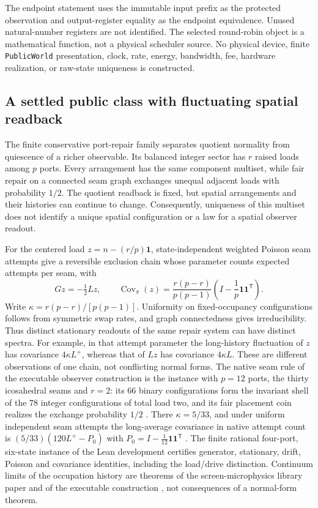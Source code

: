 \documentclass[11pt]{article}
\theoremstyle{definition}
\theoremstyle{remark}
\numberwithin{equation}{section}
\begin{document}
The endpoint statement uses the immutable input prefix as the protected
observation and output-register equality as the endpoint equivalence.  Unused
natural-number registers are not identified.  The selected round-robin object
is a mathematical function, not a physical scheduler source.  No physical
device, finite \texttt{PublicWorld} presentation, clock, rate, energy,
bandwidth, fee, hardware realization, or raw-state uniqueness is constructed.

\subsection{A settled public class with fluctuating spatial readback}
\label{subsec:settled-public-class}
The finite conservative port-repair family separates quotient normality
from quiescence of a richer observable. Its balanced integer sector has
\(r\) raised loads among \(p\) ports. Every arrangement has the same
component multiset, while fair repair on a connected seam graph exchanges
unequal adjacent loads with probability \(1/2\). The quotient readback is
fixed, but spatial arrangements and their histories can continue
to change. Consequently, uniqueness of this multiset does not identify a
unique spatial configuration or a law for a spatial observer readout.

For the centered load \(z=n-(r/p)\mathbf1\), state-independent weighted
Poisson seam attempts give a reversible exclusion chain whose parameter
counts expected attempts per seam, with
\[
 Gz=-\tfrac12Lz,\qquad
 \operatorname{Cov}_\pi(z)=\frac{r(p-r)}{p(p-1)}
       \left(I-\frac1p\mathbf1\mathbf1^{\mathsf T}\right).
\]
Write \(\kappa=r(p-r)/[p(p-1)]\).
Uniformity on fixed-occupancy configurations follows from symmetric swap
rates, and graph connectedness gives irreducibility. Thus distinct
stationary readouts of the same repair system can have distinct spectra.
For example, in that attempt parameter the long-history fluctuation of
\(z\) has covariance \(4\kappa L^+\), whereas that of \(Lz\) has
covariance \(4\kappa L\).
These are different observations of one chain, not conflicting normal
forms. The native seam rule of the executable observer construction is the
instance with \(p=12\) ports, the thirty icosahedral seams and \(r=2\): its
\(66\) binary configurations form the invariant shell of the \(78\) integer
configurations of total load two, and its fair placement coin realizes the
exchange probability \(1/2\) \citep{ophmodel}. There \(\kappa=5/33\), and
under uniform independent seam attempts the long-average covariance in
native attempt count is \((5/33)(120L^{+}-P_0)\) with
\(P_0=I-\tfrac1{12}\mathbf1\mathbf1^{\mathsf T}\) \citep{ophcontinuum}.
The finite rational four-port, six-state instance of the Lean development
\citep{ophfourcycle} certifies generator,
stationary, drift, Poisson and covariance identities, including the
load/drive distinction. Continuum limits of the occupation history are
theorems of the screen-microphysics library paper \citep{ophMicrophysics}
and of the executable construction \citep{ophcontinuum}, not consequences of
a normal-form theorem.
\end{document}
